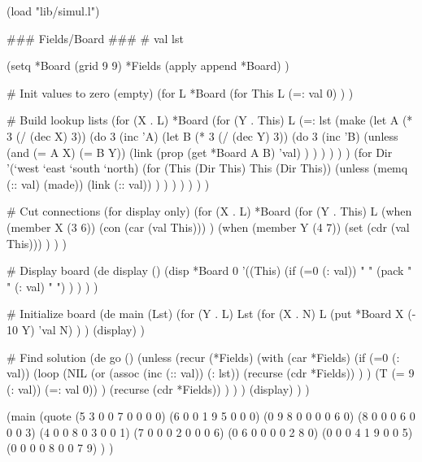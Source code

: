 \begin{wideverbatim}

(load "lib/simul.l")

### Fields/Board ###
# val lst

(setq
   *Board (grid 9 9)
   *Fields (apply append *Board) )

# Init values to zero (empty)
(for L *Board
   (for This L
      (=: val 0) ) )

# Build lookup lists
(for (X . L) *Board
   (for (Y . This) L
      (=: lst
         (make
            (let A (* 3 (/ (dec X) 3))
               (do 3
                  (inc 'A)
                  (let B (* 3 (/ (dec Y) 3))
                     (do 3
                        (inc 'B)
                        (unless (and (= A X) (= B Y))
                           (link
                              (prop (get *Board A B) 'val) ) ) ) ) ) )
            (for Dir '(`west `east `south `north)
               (for (This (Dir This)  This  (Dir This))
                  (unless (memq (:: val) (made))
                     (link (:: val)) ) ) ) ) ) ) )

\end{wideverbatim}

\begin{wideverbatim}


# Cut connections (for display only)
(for (X . L) *Board
   (for (Y . This) L
      (when (member X (3 6))
         (con (car (val This))) )
      (when (member Y (4 7))
         (set (cdr (val This))) ) ) )

# Display board
(de display ()
   (disp *Board 0
      '((This)
         (if (=0 (: val))
            "   "
            (pack " " (: val) " ") ) ) ) )

# Initialize board
(de main (Lst)
   (for (Y . L) Lst
      (for (X . N) L
         (put *Board X (- 10 Y) 'val N) ) )
   (display) )

# Find solution
(de go ()
   (unless
      (recur (*Fields)
         (with (car *Fields)
            (if (=0 (: val))
               (loop
                  (NIL
                     (or
                        (assoc (inc (:: val)) (: lst))
                        (recurse (cdr *Fields)) ) )
                  (T (= 9 (: val)) (=: val 0)) )
               (recurse (cdr *Fields)) ) ) )
      (display) ) )

(main
   (quote
      (5 3 0 0 7 0 0 0 0)
      (6 0 0 1 9 5 0 0 0)
      (0 9 8 0 0 0 0 6 0)
      (8 0 0 0 6 0 0 0 3)
      (4 0 0 8 0 3 0 0 1)
      (7 0 0 0 2 0 0 0 6)
      (0 6 0 0 0 0 2 8 0)
      (0 0 0 4 1 9 0 0 5)
      (0 0 0 0 8 0 0 7 9) ) )

\end{wideverbatim}

